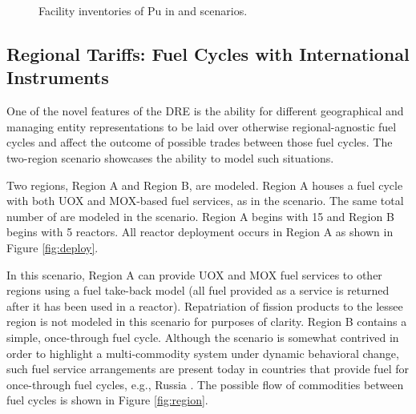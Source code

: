\begin{figure}
  \centering
  \begin{minipage}{0.67\textwidth}
    \centering 
    \vfill 
  \end{minipage}%
  \begin{minipage}{0.33\textwidth}
    \centering
  \end{minipage}%
  \caption[]{
    \label{fig:military}
    Facility inventories of Pu in \basecase and \external scenarios.}
\end{figure}

\subsection{Regional Tariffs: Fuel Cycles with International Instruments}

One of the novel features of the DRE is the ability for different geographical
and managing entity representations to be laid over otherwise regional-agnostic
fuel cycles and affect the outcome of possible trades between those fuel
cycles. The \tariff two-region scenario showcases the ability to model
such situations.

Two regions, Region A and Region B, are modeled. Region A houses a fuel cycle
with both UOX and MOX-based fuel services, as in the \basecase scenario. The
same total number of \reactors are modeled in the scenario. Region A begins with
15 \reactors and Region B begins with 5 reactors. All reactor deployment occurs
in Region A as shown in Figure \ref{fig:deploy}.

In this scenario, Region A can provide UOX and MOX fuel services to other
regions using a fuel take-back model (all fuel provided as a service is returned
after it has been used in a reactor). Repatriation of fission products to the
lessee region is not modeled in this scenario for purposes of clarity. Region B
contains a simple, once-through fuel cycle. Although the scenario is somewhat
contrived in order to highlight a multi-commodity system under dynamic
behavioral change, such fuel service arrangements are present today in countries
that provide fuel for once-through fuel cycles, e.g., Russia
\cite{wnarussia2016}. The possible flow of commodities between fuel cycles is
shown in Figure \ref{fig:region}.

